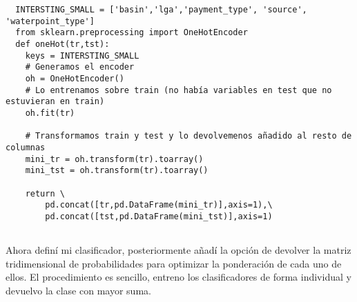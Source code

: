 \documentclass{article}
\begin{document}
\begin{verbatim}
  INTERSTING_SMALL = ['basin','lga','payment_type', 'source', 'waterpoint_type']
  from sklearn.preprocessing import OneHotEncoder
  def oneHot(tr,tst):
    keys = INTERSTING_SMALL
    # Generamos el encoder
    oh = OneHotEncoder()
    # Lo entrenamos sobre train (no había variables en test que no estuvieran en train)
    oh.fit(tr)
    
    # Transformamos train y test y lo devolvemenos añadido al resto de columnas
    mini_tr = oh.transform(tr).toarray()
    mini_tst = oh.transform(tr).toarray()

    return \
        pd.concat([tr,pd.DataFrame(mini_tr)],axis=1),\
        pd.concat([tst,pd.DataFrame(mini_tst)],axis=1)


\end{verbatim}

Ahora definí mi clasificador, posteriormente añadí la opción de devolver la matriz tridimensional de probabilidades para optimizar la ponderación de cada uno de ellos. El procedimiento es sencillo, entreno los clasificadores de forma individual y devuelvo la clase con mayor suma.
\end{document}
